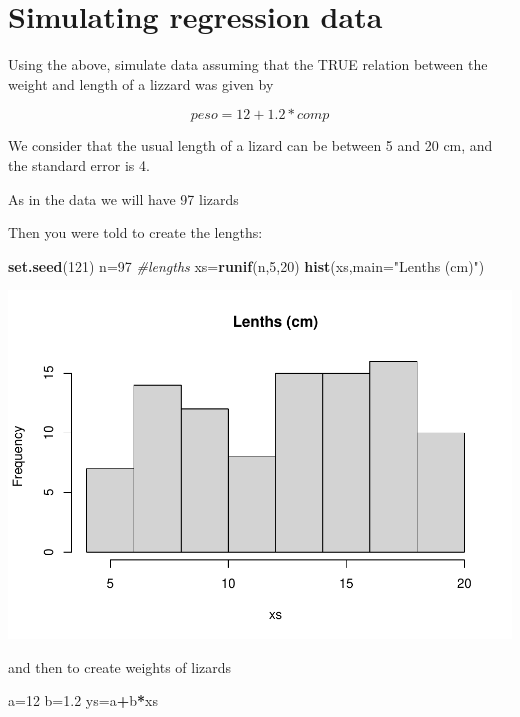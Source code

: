 \documentclass[
]{book}
\newenvironment{Shaded}{\begin{snugshade}}{\end{snugshade}}
\newcommand{\AttributeTok}[1]{\textcolor[rgb]{0.13,0.29,0.53}{#1}}
\newcommand{\CommentTok}[1]{\textcolor[rgb]{0.56,0.35,0.01}{\textit{#1}}}
\newcommand{\DecValTok}[1]{\textcolor[rgb]{0.00,0.00,0.81}{#1}}
\newcommand{\FloatTok}[1]{\textcolor[rgb]{0.00,0.00,0.81}{#1}}
\newcommand{\FunctionTok}[1]{\textcolor[rgb]{0.13,0.29,0.53}{\textbf{#1}}}
\newcommand{\NormalTok}[1]{#1}
\newcommand{\OtherTok}[1]{\textcolor[rgb]{0.56,0.35,0.01}{#1}}
\newcommand{\SpecialCharTok}[1]{\textcolor[rgb]{0.81,0.36,0.00}{\textbf{#1}}}
\newcommand{\StringTok}[1]{\textcolor[rgb]{0.31,0.60,0.02}{#1}}
\begin{document}
\hypertarget{simulating-regression-data}{%
\section{Simulating regression data}\label{simulating-regression-data}}

Using the above, simulate data assuming that the TRUE relation between the weight and length of a lizzard was given by

\[ peso = 12 + 1.2 * comp \]

We consider that the usual length of a lizard can be between 5 and 20 cm, and the standard error is 4.

As in the data we will have 97 lizards

Then you were told to create the lengths:

\begin{Shaded}
\begin{Highlighting}[]
\FunctionTok{set.seed}\NormalTok{(}\DecValTok{121}\NormalTok{)}
\NormalTok{n}\OtherTok{=}\DecValTok{97}
\CommentTok{\#lengths}
\NormalTok{xs}\OtherTok{=}\FunctionTok{runif}\NormalTok{(n,}\DecValTok{5}\NormalTok{,}\DecValTok{20}\NormalTok{)}
\FunctionTok{hist}\NormalTok{(xs,}\AttributeTok{main=}\StringTok{"Lenths (cm)"}\NormalTok{)}
\end{Highlighting}
\end{Shaded}

\includegraphics{ECOMODbook_files/figure-latex/a6.21-1.pdf}

and then to create weights of lizards

\begin{Shaded}
\begin{Highlighting}[]
\NormalTok{a}\OtherTok{=}\DecValTok{12}
\NormalTok{b}\OtherTok{=}\FloatTok{1.2}
\NormalTok{ys}\OtherTok{=}\NormalTok{a}\SpecialCharTok{+}\NormalTok{b}\SpecialCharTok{*}\NormalTok{xs}
\end{Highlighting}
\end{Shaded}
\end{document}
